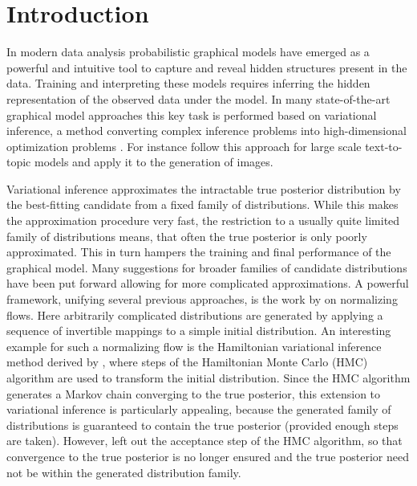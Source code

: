 \section{Introduction}

In modern data analysis probabilistic graphical models have emerged as a powerful and intuitive tool to capture and reveal hidden structures present in the data. Training and interpreting these models requires inferring the hidden representation of the observed data under the model. In many state-of-the-art graphical model approaches this key task is performed based on variational inference, a method converting complex inference problems into high-dimensional optimization problems \parencite{Jordan1999}. For instance \textcite{Hoffman2013} follow this approach for large scale text-to-topic models and \textcite{Gregor2015, Rezende2014, Kingma2014} apply it to the generation of images. 

Variational inference approximates the intractable true posterior distribution by the best-fitting candidate from a fixed family of distributions. While this makes the approximation procedure very fast, the restriction to a usually quite limited family of distributions means, that often the true posterior is only poorly approximated. This in turn hampers the training and final performance of the graphical model. Many suggestions for broader families of candidate distributions have been put forward allowing for more complicated approximations. A powerful framework, unifying several previous approaches, is the work by \textcite{Rezende2015} on normalizing flows. Here arbitrarily complicated distributions are generated by applying a sequence of invertible mappings to a simple initial distribution. An interesting example for such a normalizing flow is the Hamiltonian variational inference method derived by \textcite{Salimans2014}, where steps of the Hamiltonian Monte Carlo (HMC) algorithm are used to transform the initial distribution. Since the HMC algorithm generates a Markov chain converging to the true posterior, this extension to variational inference is particularly appealing, because the generated family of distributions is guaranteed to contain the true posterior (provided enough steps are taken). However, \textcite{Salimans2014} left out the acceptance step of the HMC algorithm, so that convergence to the true posterior is no longer ensured and the true posterior need not be within the generated distribution family.

